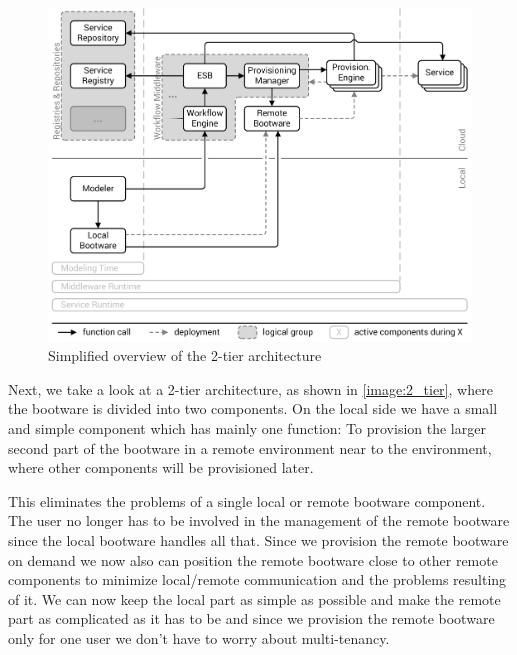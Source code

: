 \begin{figure}[!htbp]
	\centering
	\includegraphics[resolution=600]{design/assets/2_tier}
	\caption{Simplified overview of the 2-tier architecture}
	\label{image:2_tier}
\end{figure}

Next, we take a look at a 2-tier architecture, as shown in \autoref{image:2_tier}, where the bootware is divided into two components.
On the local side we have a small and simple component which has mainly one function: To provision the larger second part of the bootware in a remote environment near to the environment, where other components will be provisioned later.

This eliminates the problems of a single local or remote bootware component.
The user no longer has to be involved in the management of the remote bootware since the local bootware handles all that.
Since we provision the remote bootware on demand we now also can position the remote bootware close to other remote components to minimize local/remote communication and the problems resulting of it.
We can now keep the local part as simple as possible and make the remote part as complicated as it has to be and since we provision the remote bootware only for one user we don't have to worry about multi-tenancy.

